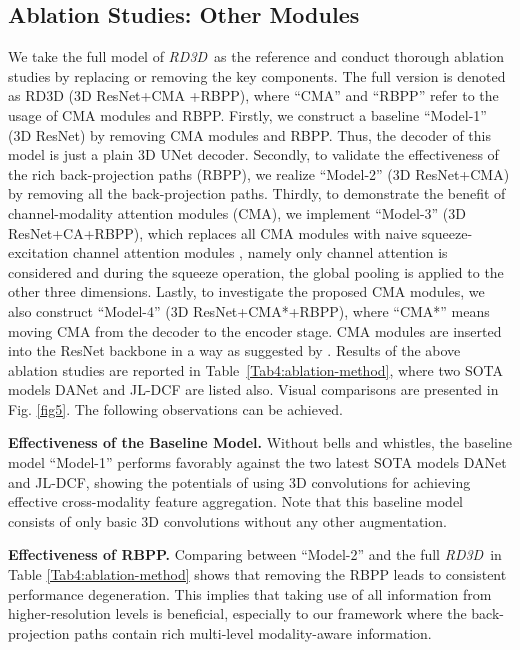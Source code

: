\documentclass[letterpaper]{article}
\def\ourmodel{\emph{RD3D}}
\begin{document}
\subsection{Ablation Studies: Other Modules}
We take the full model of \ourmodel~as the reference and conduct thorough ablation studies by replacing or removing the key components. The full version is denoted as RD3D (3D ResNet+CMA +RBPP), where ``CMA'' and ``RBPP'' refer to the usage of CMA modules and RBPP. Firstly, we construct a baseline ``Model-1'' (3D ResNet) by removing CMA modules and RBPP. Thus, the decoder of this model is just a plain 3D UNet decoder.
Secondly, to validate the effectiveness of the rich back-projection paths (RBPP), we realize ``Model-2'' (3D ResNet+CMA) by removing all the back-projection paths.
Thirdly, to demonstrate the benefit of channel-modality attention modules (CMA), we implement ``Model-3'' (3D ResNet+CA+RBPP), which replaces all CMA modules with naive squeeze-excitation channel attention modules \cite{hu2018squeeze}, namely only channel attention is considered and during the squeeze operation, the global pooling is applied to the other three dimensions. 
Lastly, to investigate the proposed CMA modules, we also construct ``Model-4'' (3D ResNet+CMA*+RBPP), where ``CMA*'' means moving CMA from the decoder to the encoder stage. CMA modules are inserted into the ResNet backbone in a way as suggested by \cite{hu2018squeeze}. Results of the above ablation studies are reported in Table~\ref{Tab4:ablation-method}, where two SOTA models DANet and JL-DCF are listed also. Visual comparisons are presented in Fig. \ref{fig5}. The following observations can be achieved.

\noindent \textbf{Effectiveness of the Baseline Model.} Without bells and whistles, the baseline model ``Model-1'' performs favorably against the two latest SOTA models DANet and JL-DCF, showing the potentials of using 3D convolutions for achieving effective cross-modality feature aggregation. Note that this baseline model consists of only basic 3D convolutions without any other augmentation.

\noindent \textbf{Effectiveness of RBPP.} Comparing between ``Model-2'' and the full \ourmodel~in Table \ref{Tab4:ablation-method} shows that removing the RBPP leads to consistent performance degeneration. This implies that taking use of all information from higher-resolution levels is beneficial, especially to our framework where the back-projection paths contain rich multi-level modality-aware information.
\end{document}
